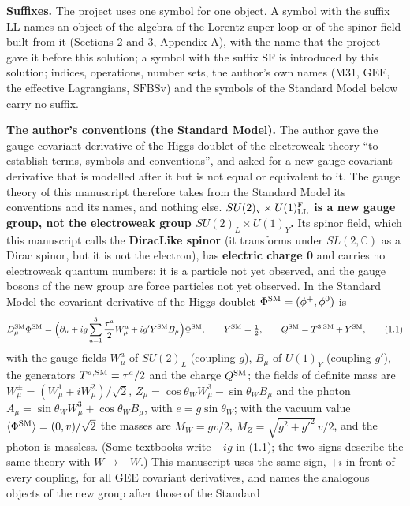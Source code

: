 \documentclass[
  10pt,
]{article}
\begin{document}
\textbf{Suffixes.} The project uses one symbol for one object. A symbol
with the suffix LL names an object of the algebra of the Lorentz
super-loop or of the spinor field built from it (Sections 2 and 3,
Appendix A), with the name that the project gave it before this
solution; a symbol with the suffix SF is introduced by this solution;
indices, operations, number sets, the author's own names (M31, GEE, the
effective Lagrangians, \(\mathrm{SFBSv}\)) and the symbols of the
Standard Model below carry no suffix.

\textbf{The author's conventions (the Standard Model).} The author gave
the gauge-covariant derivative of the Higgs doublet of the electroweak
theory ``to establish terms, symbols and conventions'', and asked for a
new gauge-covariant derivative that is modelled after it but is not
equal or equivalent to it. The gauge theory of this manuscript therefore
takes from the Standard Model its conventions and its names, and nothing
else. \textbf{\(SU(2)_{\rm v}\times U(1)^{\rm F}_{\rm LL}\) is a new
gauge group, not the electroweak group \(SU(2)_L\times U(1)_Y\).} Its
spinor field, which this manuscript calls the \textbf{DiracLike spinor}
(it transforms under \(SL(2,\mathbb C)\) as a Dirac spinor, but it is
not the electron), has \textbf{electric charge 0} and carries no
electroweak quantum numbers; it is a particle not yet observed, and the
gauge bosons of the new group are force particles not yet observed. In
the Standard Model the covariant derivative of the Higgs doublet
\(\Phi^{\rm SM}=(\phi^+,\phi^0)\) is
\[D^{\rm SM}_\mu\Phi^{\rm SM}=\Big(\partial_\mu+ig\sum_{a=1}^3\frac{\tau^a}2W^a_\mu+ig'Y^{\rm SM}B_\mu\Big)\Phi^{\rm SM},\qquad Y^{\rm SM}=\tfrac12,\qquad Q^{\rm SM}=T^{3,{\rm SM}}+Y^{\rm SM},\tag{1.1}\]
with the gauge fields \(W^a_\mu\) of \(SU(2)_L\) (coupling \(g\)),
\(B_\mu\) of \(U(1)_Y\) (coupling \(g'\)), the generators
\(T^{a,{\rm SM}}=\tau^a/2\) and the charge \(Q^{\rm SM}\); the fields of
definite mass are \(W^\pm_\mu=(W^1_\mu\mp iW^2_\mu)/\sqrt2\),
\(Z_\mu=\cos\theta_WW^3_\mu-\sin\theta_WB_\mu\) and the photon
\(A_\mu=\sin\theta_WW^3_\mu+\cos\theta_WB_\mu\), with
\(e=g\sin\theta_W\); with the vacuum value
\(\langle\Phi^{\rm SM}\rangle=(0,v)/\sqrt2\) the masses are
\(M_W=gv/2\), \(M_Z=\sqrt{g^2+g'^2}\,v/2\), and the photon is massless.
(Some textbooks write \(-ig\) in (1.1); the two signs describe the same
theory with \(W\to-W\).) This manuscript uses the same sign, \(+i\) in
front of every coupling, for all GEE covariant derivatives, and names
the analogous objects of the new group after those of the Standard
\end{document}
